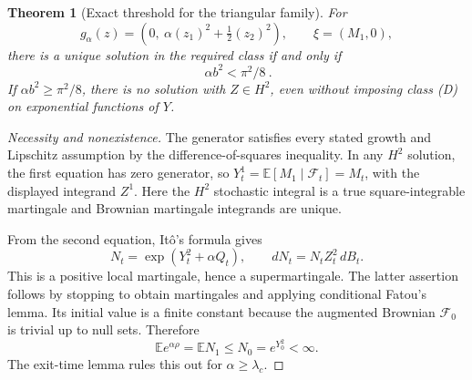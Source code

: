 \documentclass[11pt,a4paper]{article}
\newcommand{\E}{\mathbb E}
\newtheorem{theorem}{Theorem}[section]
\theoremstyle{definition}
\theoremstyle{remark}
\begin{document}
\begin{theorem}[Exact threshold for the triangular family]
For
\[
 g_\alpha(z)=\left(0,\ \alpha(z_1)^2+\tfrac12(z_2)^2\right),
 \qquad \xi=(M_1,0),
\]
there is a unique solution in the required class if and only if
\[
 \boxed{\ \alpha b^2<\pi^2/8\ }.
\]
If $\alpha b^2\geq\pi^2/8$, there is no solution with $Z\in H^2$, even without imposing class (D) on exponential functions of $Y$.
\end{theorem}
\begin{proof}[Necessity and nonexistence]
The generator satisfies every stated growth and Lipschitz assumption by the difference-of-squares inequality. In any $H^2$ solution, the first equation has zero generator, so $Y_t^1=\E[M_1\mid\mathcal F_t]=M_t$, with the displayed integrand $Z^1$. Here the $H^2$ stochastic integral is a true square-integrable martingale and Brownian martingale integrands are unique.

From the second equation, It\^o's formula gives
\[
 N_t=\exp(Y_t^2+\alpha Q_t),\qquad dN_t=N_t Z_t^2\,dB_t.
\]
This is a positive local martingale, hence a supermartingale. The latter assertion follows by stopping to obtain martingales and applying conditional Fatou's lemma. Its initial value is a finite constant because the augmented Brownian $\mathcal F_0$ is trivial up to null sets. Therefore
\[
 \E e^{\alpha\rho}=\E N_1\leq N_0=e^{Y_0^2}<\infty.
\]
The exit-time lemma rules this out for $\alpha\geq\lambda_c$.
\end{proof}
\end{document}
